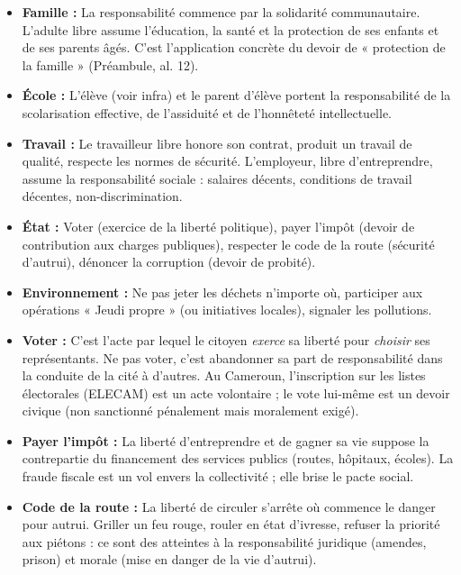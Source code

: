 \documentclass[11pt]{article}
\begin{document}
\begin{itemize}
    \item \textbf{Famille :} La responsabilité commence par la solidarité communautaire. L'adulte libre assume l'éducation, la santé et la protection de ses enfants et de ses parents âgés. C'est l'application concrète du devoir de « protection de la famille » (Préambule, al. 12).
    \item \textbf{École :} L'élève (voir infra) et le parent d'élève portent la responsabilité de la scolarisation effective, de l'assiduité et de l'honnêteté intellectuelle.
    \item \textbf{Travail :} Le travailleur libre honore son contrat, produit un travail de qualité, respecte les normes de sécurité. L'employeur, libre d'entreprendre, assume la responsabilité sociale : salaires décents, conditions de travail décentes, non-discrimination.
    \item \textbf{État :} Voter (exercice de la liberté politique), payer l'impôt (devoir de contribution aux charges publiques), respecter le code de la route (sécurité d'autrui), dénoncer la corruption (devoir de probité).
    \item \textbf{Environnement :} Ne pas jeter les déchets n'importe où, participer aux opérations « Jeudi propre » (ou initiatives locales), signaler les pollutions.
\end{itemize}

\begin{exemplebox}
\begin{itemize}
    \item \textbf{Voter :} C'est l'acte par lequel le citoyen \emph{exerce} sa liberté pour \emph{choisir} ses représentants. Ne pas voter, c'est abandonner sa part de responsabilité dans la conduite de la cité à d'autres. Au Cameroun, l'inscription sur les listes électorales (ELECAM) est un acte volontaire ; le vote lui-même est un devoir civique (non sanctionné pénalement mais moralement exigé).
    \item \textbf{Payer l'impôt :} La liberté d'entreprendre et de gagner sa vie suppose la contrepartie du financement des services publics (routes, hôpitaux, écoles). La fraude fiscale est un vol envers la collectivité ; elle brise le pacte social.
    \item \textbf{Code de la route :} La liberté de circuler s'arrête où commence le danger pour autrui. Griller un feu rouge, rouler en état d'ivresse, refuser la priorité aux piétons : ce sont des atteintes à la responsabilité juridique (amendes, prison) et morale (mise en danger de la vie d'autrui).
\end{itemize}
\end{exemplebox}
\end{document}
